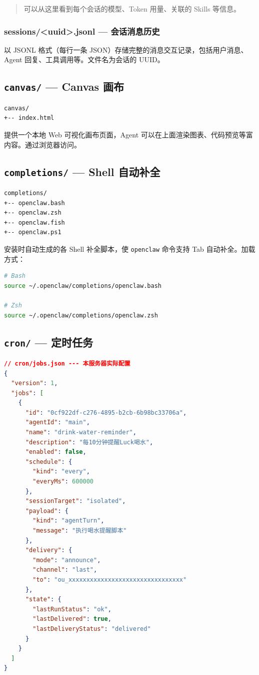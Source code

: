 \begin{quote}
可以从这里看到每个会话的模型、Token 用量、关联的 Skills 等信息。
\end{quote}

\subsubsection{sessions/<uuid>.jsonl --- 会话消息历史}


以 JSONL 格式（每行一条 JSON）存储完整的消息交互记录，包括用户消息、Agent 回复、工具调用等。文件名为会话的 UUID。

\subsection{\texttt{canvas/} --- Canvas 画布}


\begin{lstlisting}
canvas/
+-- index.html
\end{lstlisting}

提供一个本地 Web 可视化画布页面，Agent 可以在上面渲染图表、代码预览等富内容。通过浏览器访问。

\subsection{\texttt{completions/} --- Shell 自动补全}


\begin{lstlisting}
completions/
+-- openclaw.bash
+-- openclaw.zsh
+-- openclaw.fish
+-- openclaw.ps1
\end{lstlisting}

安装时自动生成的各 Shell 补全脚本，使 \texttt{openclaw} 命令支持 Tab 自动补全。加载方式：

\begin{lstlisting}[language=bash]
# Bash
source ~/.openclaw/completions/openclaw.bash

# Zsh
source ~/.openclaw/completions/openclaw.zsh
\end{lstlisting}

\subsection{\texttt{cron/} --- 定时任务}


\begin{lstlisting}[language=json]
// cron/jobs.json --- 本服务器实际配置
{
  "version": 1,
  "jobs": [
    {
      "id": "0cf922df-c276-4895-b2cb-6b98bc33706a",
      "agentId": "main",
      "name": "drink-water-reminder",
      "description": "每10分钟提醒Luck喝水",
      "enabled": false,
      "schedule": {
        "kind": "every",
        "everyMs": 600000
      },
      "sessionTarget": "isolated",
      "payload": {
        "kind": "agentTurn",
        "message": "执行喝水提醒脚本"
      },
      "delivery": {
        "mode": "announce",
        "channel": "last",
        "to": "ou_xxxxxxxxxxxxxxxxxxxxxxxxxxxxxxxx"
      },
      "state": {
        "lastRunStatus": "ok",
        "lastDelivered": true,
        "lastDeliveryStatus": "delivered"
      }
    }
  ]
}
\end{lstlisting}

